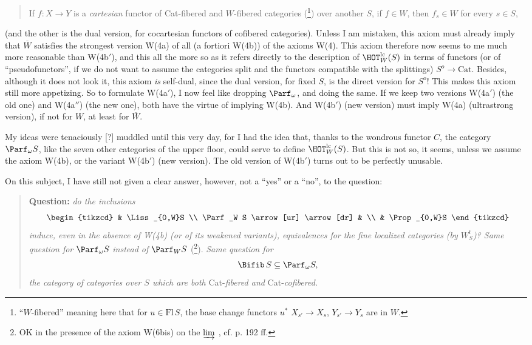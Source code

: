 \begin{quote}
If $f : X \longrightarrow Y$ is a \textit{cartesian} functor of Cat-fibered and $W$-fibered categories (\footnote{``$W$-fibered'' meaning here that for $u \in \mathrm{Fl}\,S$, the base change functors $u^*$ $X_{s'} \longrightarrow X_s$, $Y_{s'} \longrightarrow Y_s$ are in $W$.}) over another $S$, if $f \in W$, then $f_s \in W$ for every $s \in S$,
\end{quote}

(and the other is the dual version, for cocartesian functors of cofibered categories). Unless I am mistaken, this axiom must already imply that $\overline{W}$ satisfies the strongest version W(4a)
of all (a fortiori W(4b)) of the axioms W(4). This axiom therefore now seems to me much more reasonable than W(4b$'$), and this all the more so as it refers directly to the description of $\HOT^{\mathrm{lc}}_W(S)$ in terms of functors (or of ``pseudofunctors'', if we do not want to assume the categories split and the functors compatible with the splittings) $S^{o} \longrightarrow \mathrm{Cat}$. %
Besides, although it does not look it, this axiom \textit{is} self-dual, since the dual version, for fixed $S$, is the direct version for $S^{o}$! This makes this axiom still more appetizing. So to formulate W(4a$'$), I now feel like dropping $\Parf_\omega$, and doing the same. If we keep two versions W(4a$'$) (the old one) and W(4a$''$) (the new one), both have the virtue of implying W(4b). And W(4b$'$) (new version) must imply W(4a) (ultrastrong version), if not for $W$, at least for $\overline{W}$.

My ideas were tenaciously [?] muddled
until this very day, for I had the idea that, thanks to the wondrous functor $C$, the category $\Parf_\omega S$, like the seven other categories of the upper floor, could serve to define $\HOT^{\mathrm{lc}}_W(S)$. But this is not so, it seems, unless we assume the axiom W(4b), or the variant W(4b$'$) (new version). The old version of W(4b$'$) turns out to be perfectly unusable. %

On this subject, I have still not given a clear answer, however, not a ``yes'' or a ``no'', to the question:

\begin{quote}
\textbf{Question:} \textit{do the inclusions}
\[
\begin{tikzcd}
 & \Liss_{0,W}S \\
\Parf_W S \arrow[ur] \arrow[dr] & \\
 & \Prop_{0,W}S
\end{tikzcd}
\]
\textit{induce, even in the absence of W(4b) (or of its weakened variants), equivalences for the fine localized categories (by $W^{\mathrm{f}}_S$)? Same question for} $\Parf_\omega S$ \textit{instead of} $\Parf_W S$ (\footnote{OK in the presence of the axiom W(6bis) on the $\varinjlim$ , cf. p. 192 ff.}). \textit{Same question for}
\[ \Bifib\, S \subseteq \Parf_\omega S, \]
\textit{the category of categories over $S$ which are both} Cat-\textit{fibered and} Cat-\textit{cofibered.}
\end{quote}


